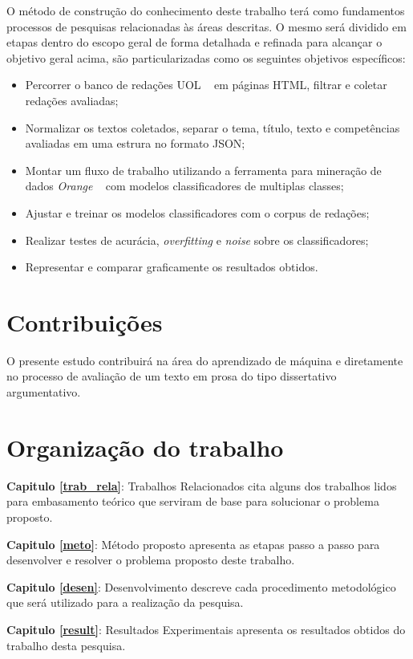 O método de construção do conhecimento deste trabalho terá como fundamentos processos de pesquisas relacionadas às áreas descritas. O mesmo será dividido em etapas dentro do escopo geral de forma detalhada e refinada para alcançar o objetivo geral acima, são particularizadas como os seguintes objetivos específicos:

\begin{itemize}
 \item Percorrer o banco de redações UOL ~\cite{uol_banco_redacoes:2017} em páginas HTML, filtrar e coletar redações avaliadas;
 \item Normalizar os textos coletados, separar o tema, título, texto e competências avaliadas em uma estrura no formato JSON;
 \item Montar um fluxo de trabalho utilizando a ferramenta para mineração de dados \textit{Orange} ~\cite{orange_3:2017} com modelos classificadores de multiplas classes;
 \item Ajustar e treinar os modelos classificadores com o corpus de redações; 
 \item Realizar testes de acurácia, \textit{overfitting} e \textit{noise} sobre os classificadores;
 \item Representar e comparar graficamente os resultados obtidos. 
\end{itemize}

\section{Contribuições}

O presente estudo contribuirá na área do aprendizado de máquina e diretamente no processo de avaliação de um texto em prosa do tipo dissertativo argumentativo.

\section{Organização do trabalho}

\noindent \textbf{Capitulo \ref{trab_rela}}: Trabalhos Relacionados cita alguns dos trabalhos lidos para  embasamento teórico que serviram de base para solucionar o problema proposto.

\noindent \textbf{Capitulo \ref{meto}}: Método proposto apresenta as etapas passo a passo para desenvolver e resolver o problema proposto deste trabalho.

\noindent \textbf{Capitulo \ref{desen}}: Desenvolvimento descreve cada procedimento metodológico que será
utilizado para a realização da pesquisa.

\noindent \textbf{Capitulo \ref{result}}: Resultados Experimentais apresenta os resultados obtidos do trabalho desta pesquisa.
